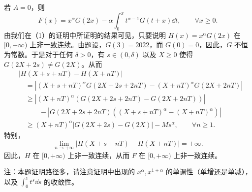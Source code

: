 \begin{solution}
若 $A=0$，则
\[
F(x)=x^\alpha G(2x)-\alpha\int_0^xt^{\alpha-1}G(t+x)\dd t,\qquad \forall x\ge0.
\]
由我们在（1）的证明中所证明的结果可见，只要说明 $H(x)=x^\alpha G(2x)$ 在 $[0,+\infty)$ 上非一致连续。由题设，$G(3)=2022$，而 $G(0)=0$，因此，$G$ 不恒为常数。于是对于任何 $\delta>0$，有 $s\in(0,\delta)$ 以及 $X\ge0$ 使得 $G(2X+2s)\ne G(2X)$。从而
\begin{align*}
&|H(X+s+nT)-H(X+nT)|\\
&\quad=\left|(X+s+nT)^\alpha G(2X+2s+2nT)-(X+nT)^\alpha G(2X+2nT)\right|\\
&\quad\ge\left|(X+nT)^\alpha\left(G(2X+2s+2nT)-G(2X+2nT)\right)\right|\\
&\quad\qquad-\left|G(2X+2s+2nT)\left((X+s+nT)^\alpha-(X+nT)^\alpha\right)\right|\\
&\quad\ge(X+nT)^\alpha\left|G(2X+2s)-G(2X)\right|-Ms^\alpha,\qquad \forall n\ge1.
\end{align*}
特别，
\[
\lim_{n\to+\infty}\left|H(X+s+nT)-H(X+nT)\right|=+\infty.
\]
因此，$H$ 在 $[0,+\infty)$ 上非一致连续，从而 $F$ 在 $[0,+\infty)$ 上非一致连续。

注：本题证明路径多，请注意证明中出现的 $x^\alpha,x^{1+\alpha}$ 的单调性（单增还是单减），以及 $\int_0^1t^s\dd s$ 的收敛性。
\end{solution}
